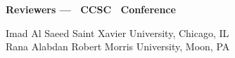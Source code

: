 \documentclass{article}
\begin{document}
\begingroup
  \centering
  \textbf{\large Reviewers --- \confYear\ CCSC \confName\ Conference}\\
\endgroup

\vspace{10pt}

{\parindent0pt
Imad Al Saeed \dotfill Saint Xavier University, Chicago, IL\\
Rana Alabdan \dotfill Robert Morris University, Moon, PA\\
}
\end{document}
